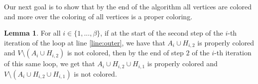 \documentclass{article}
\theoremstyle{definition}
\newtheorem{lemma}{Lemma}[section]
\begin{document}

Our next goal is to show that by the end of the algorithm all vertices are colored and more over the coloring of all vertices is a proper coloring.

\begin{lemma}  For all $i \in \{1, ..., \beta\}$, if at the start of the second step of the $i$-th iteration of the loop at line \ref{line:outer}, we have that $A_i \cup H_{i,2}$ is properly colored and $V \setminus (A_i \cup H_{i,2})$ is not colored, then by the end of step $2$ of the $i$-th iteration of this same loop, we get that $A_i \cup H_{i,2} \cup H_{i,1}$ is properly colored and $V \setminus (A_i \cup H_{i,2} \cup H_{i,1})$ is not colored.\end{lemma}
\end{document}
